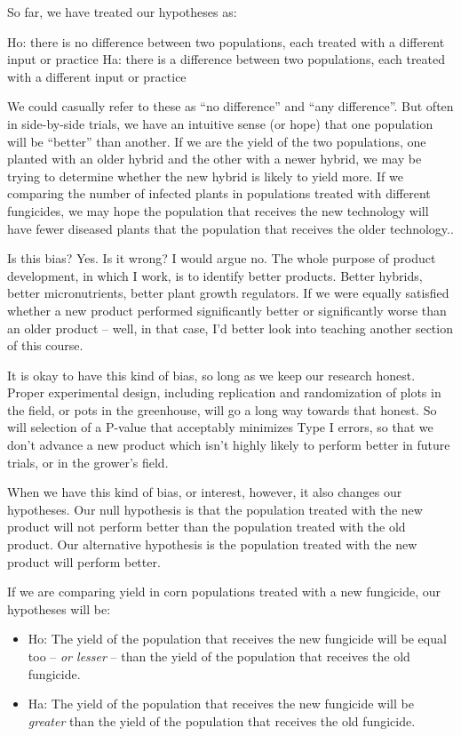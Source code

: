 \documentclass[
]{book}
\providecommand{\tightlist}{%
  \setlength{\itemsep}{0pt}\setlength{\parskip}{0pt}}
\begin{document}
So far, we have treated our hypotheses as:

Ho: there is no difference between two populations, each treated with a different input or practice
Ha: there is a difference between two populations, each treated with a different input or practice

We could casually refer to these as ``no difference'' and ``any difference''. But often in side-by-side trials, we have an intuitive sense (or hope) that one population will be ``better'' than another. If we are the yield of the two populations, one planted with an older hybrid and the other with a newer hybrid, we may be trying to determine whether the new hybrid is likely to yield more. If we comparing the number of infected plants in populations treated with different fungicides, we may hope the population that receives the new technology will have fewer diseased plants that the population that receives the older technology..

Is this bias? Yes. Is it wrong? I would argue no. The whole purpose of product development, in which I work, is to identify better products. Better hybrids, better micronutrients, better plant growth regulators. If we were equally satisfied whether a new product performed significantly better or significantly worse than an older product -- well, in that case, I'd better look into teaching another section of this course.

It is okay to have this kind of bias, so long as we keep our research honest. Proper experimental design, including replication and randomization of plots in the field, or pots in the greenhouse, will go a long way towards that honest. So will selection of a P-value that acceptably minimizes Type I errors, so that we don't advance a new product which isn't highly likely to perform better in future trials, or in the grower's field.

When we have this kind of bias, or interest, however, it also changes our hypotheses. Our null hypothesis is that the population treated with the new product will not perform better than the population treated with the old product. Our alternative hypothesis is the population treated with the new product will perform better.

If we are comparing yield in corn populations treated with a new fungicide, our hypotheses will be:

\begin{itemize}
\tightlist
\item
  Ho: The yield of the population that receives the new fungicide will be equal too -- \emph{or lesser} -- than the yield of the population that receives the old fungicide.
\item
  Ha: The yield of the population that receives the new fungicide will be \emph{greater} than the yield of the population that receives the old fungicide.
\end{itemize}
\end{document}
